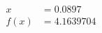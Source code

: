 \documentclass[preview]{standalone}
\begin{document}
\begin{align*}
x &= 0.0897\\f(x) &= 4.1639704
\end{align*}
\end{document}
